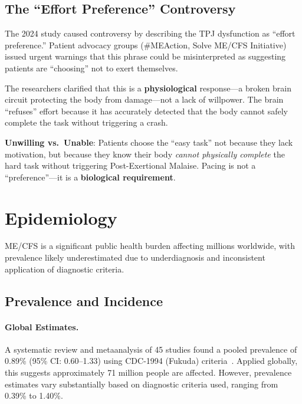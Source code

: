\subsection{The ``Effort Preference'' Controversy}
\label{subsec:effort-preference}

The 2024 study caused controversy by describing the TPJ dysfunction as ``effort preference.'' Patient advocacy groups (\#MEAction, Solve ME/CFS Initiative) issued urgent warnings that this phrase could be misinterpreted as suggesting patients are ``choosing'' not to exert themselves.

The researchers clarified that this is a \textbf{physiological} response---a broken brain circuit protecting the body from damage---not a lack of willpower. The brain ``refuses'' effort because it has accurately detected that the body cannot safely complete the task without triggering a crash.

\begin{tcolorbox}[colback=blue!5!white,colframe=blue!75!black,title=Key Distinction]
\textbf{Unwilling vs.\ Unable}: Patients choose the ``easy task'' not because they lack motivation, but because they know their body \emph{cannot physically complete} the hard task without triggering Post-Exertional Malaise. Pacing is not a ``preference''---it is a \textbf{biological requirement}.
\end{tcolorbox}

\section{Epidemiology}
\label{sec:epidemiology}

ME/CFS is a significant public health burden affecting millions worldwide, with prevalence likely underestimated due to underdiagnosis and inconsistent application of diagnostic criteria.

\subsection{Prevalence and Incidence}
\label{subsec:prevalence}

\paragraph{Global Estimates.}
A systematic review and meta\-analysis of 45 studies found a pooled prevalence of 0.89\% (95\% CI: 0.60--1.33) using CDC-1994 (Fukuda) criteria~\cite{Lim2020prevalence}. Applied globally, this suggests approximately 71 million people are affected. However, prevalence estimates vary sub\-stantially based on diagnostic criteria used, ranging from 0.39\% to 1.40\%.

